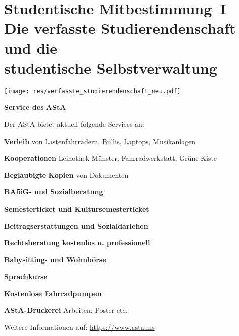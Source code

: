 \section[Studentische Mitbestimmung]{Studentische Mitbestimmung~I\\Die verfasste Studierendenschaft und die \\studentische Selbstverwaltung}
\label{studmit}

\begin{center}
    	\texttt{[image: res/verfasste\_studierendenschaft\_neu.pdf]}
	
	\begin{minipage}{0.25\textwidth}
		\footnotesize
		\begin{center}
			\large\textbf{Service des AStA}
		\end{center}
		
		\medskip
				
		Der AStA bietet aktuell folgende Services an:
				
		\smallskip

		\textbf{Verleih} von Lastenfahrrädern, Bullis, Laptops, Musikanlagen
		
		\textbf{Kooperationen} Leihothek Münster, Fahrradwerkstatt, Grüne Kiste
		
		\textbf{Beglaubigte Kopien} von Dokumenten
		
		\textbf{BAföG- und Sozialberatung}
		
		\textbf{Semesterticket und Kultursemesterticket}
		
		\textbf{Beitragserstattungen und Sozialdarlehen}
		
		\textbf{Rechtsberatung kostenlos u. professionell}
		
		\textbf{Babysitting- und Wohnbörse}
		
		\textbf{Sprachkurse}
		
	        \textbf{Kostenlose Fahrradpumpen}
            	
		\textbf{AStA-Druckerei} Arbeiten, Poster etc.
		
		\medskip
		Weitere Informationen auf: \url{https://www.asta.ms}
	\end{minipage}
\end{center}

